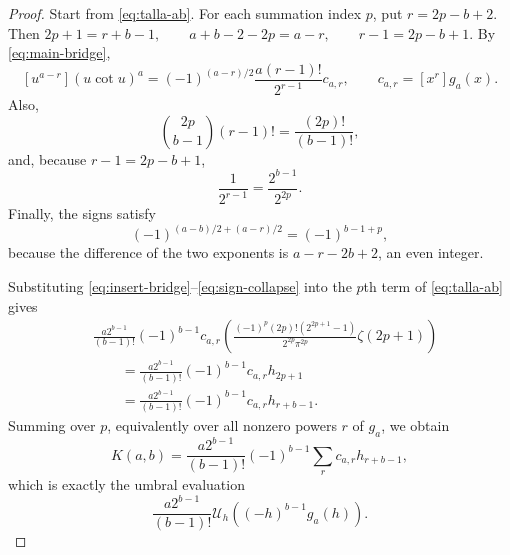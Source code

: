 \documentclass[10pt,a4paper]{amsart}
\begin{document}
\begin{proof}
Start from \eqref{eq:talla-ab}.  For each summation index $p$, put
\(r=2p-b+2\).
Then
\(2p+1=r+b-1, \qquad a+b-2-2p=a-r, \qquad r-1=2p-b+1\).
By \eqref{eq:main-bridge},
\begin{equation}
\label{eq:insert-bridge}
[u^{a-r}](u\cot u)^a
=(-1)^{(a-r)/2}
\frac{a(r-1)!}{2^{r-1}}c_{a,r},
\qquad
c_{a,r}=[x^r]g_a(x).
\end{equation}
Also,
\begin{equation}
\label{eq:binomial-collapse}
\binom{2p}{b-1}(r-1)!
=\frac{(2p)!}{(b-1)!},
\end{equation}
and, because $r-1=2p-b+1$,
\begin{equation}
\label{eq:power-collapse}
\frac1{2^{r-1}}=\frac{2^{b-1}}{2^{2p}}.
\end{equation}
Finally, the signs satisfy
\begin{equation}
\label{eq:sign-collapse}
(-1)^{(a-b)/2+(a-r)/2}
=(-1)^{b-1+p},
\end{equation}
because the difference of the two exponents is
$a-r-2b+2$, an even integer.

Substituting \eqref{eq:insert-bridge}--\eqref{eq:sign-collapse} into the
$p$th term of \eqref{eq:talla-ab} gives
\begin{align*}
&\frac{a2^{b-1}}{(b-1)!}
(-1)^{b-1}c_{a,r}
\left(
\frac{(-1)^p(2p)!(2^{2p+1}-1)}{2^{2p}\pi^{2p}}
\zeta(2p+1)
\right)\\
&\qquad
=\frac{a2^{b-1}}{(b-1)!}
(-1)^{b-1}c_{a,r}h_{2p+1}\\
&\qquad
=\frac{a2^{b-1}}{(b-1)!}
(-1)^{b-1}c_{a,r}h_{r+b-1}.
\end{align*}
Summing over $p$, equivalently over all nonzero powers $r$ of $g_a$,
we obtain
\[
K(a,b)
=\frac{a2^{b-1}}{(b-1)!}(-1)^{b-1}
\sum_r c_{a,r}h_{r+b-1},
\]
which is exactly the umbral evaluation
\[
\frac{a2^{b-1}}{(b-1)!}
\mathcal U_h\!\left((-h)^{b-1}g_a(h)\right).
\]
\end{proof}
\end{document}
